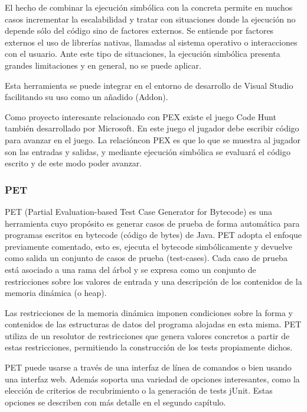 El hecho de combinar la ejecuci\'on simb\'olica con la concreta permite en muchos casos incrementar la escalabilidad y tratar con situaciones donde la ejecuci\'on no depende s\'olo del c\'odigo sino de factores externos. Se entiende por factores externos el uso de librer\'ias nativas, llamadas al sistema operativo o interacciones con el usuario. Ante este tipo de situaciones, la ejecuci\'on simb\'olica presenta grandes limitaciones y en general, no se puede aplicar.

Esta herramienta se puede integrar en el entorno de desarrollo de Visual Studio facilitando su uso como un a\~nadido (Add\-on).

Como proyecto interesante relacionado con PEX existe el juego Code Hunt tambi\'en desarrollado por Microsoft. En este juego el jugador debe escribir c\'odigo para avanzar en el juego. La relaci\'oncon PEX es que lo que se muestra al jugador son las entradas y salidas, y mediante ejecuci\'on simb\'olica se evaluar\'a el c\'odigo escrito y de este modo poder avanzar.

\subsubsection{PET}
\label{ap25:sec:pet}

PET (Partial Evaluation-based Test Case Generator for Bytecode) es una herramienta cuyo prop\'osito es generar casos de prueba de forma autom\'atica para programas escritos en bytecode (c\'odigo de bytes) de Java. PET adopta el enfoque previamente comentado, esto es, ejecuta el bytecode simb\'olicamente y devuelve como salida un conjunto de casos de prueba (test-cases). Cada caso de prueba est\'a asociado a una rama del \'arbol y se expresa como un conjunto de restricciones sobre los valores de entrada y una descripci\'on de los contenidos de la memoria din\'amica (o heap).

Las restricciones de la memoria din\'amica imponen condiciones sobre la forma y contenidos de las estructuras de datos del programa alojadas en esta misma. PET utiliza de un resolutor de restricciones que genera valores concretos a partir de estas restricciones, permitiendo la construcci\'on de los
tests propiamente dichos.

PET puede usarse a trav\'es de una interfaz de l\'inea de comandos o bien usando una interfaz web. Adem\'as soporta una variedad de opciones interesantes, como la elecci\'on de criterios de recubrimiento o la generaci\'on de tests jUnit. Estas opciones se describen con m\'as detalle en el segundo cap\'itulo.

